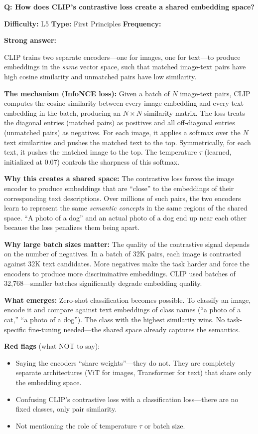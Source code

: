 \begin{interviewq}
\textbf{Q: How does CLIP's contrastive loss create a shared embedding space?}

\textbf{Difficulty:} L5 \quad \textbf{Type:} First Principles \quad \textbf{Frequency:} \freqmed{}

\textbf{Strong answer:}

CLIP trains two separate encoders---one for images, one for text---to produce embeddings in the \textit{same} vector space, such that matched image-text pairs have high cosine similarity and unmatched pairs have low similarity.

\textbf{The mechanism (InfoNCE loss):} Given a batch of $N$ image-text pairs, CLIP computes the cosine similarity between every image embedding and every text embedding in the batch, producing an $N \times N$ similarity matrix. The loss treats the diagonal entries (matched pairs) as positives and all off-diagonal entries (unmatched pairs) as negatives. For each image, it applies a softmax over the $N$ text similarities and pushes the matched text to the top. Symmetrically, for each text, it pushes the matched image to the top. The temperature $\tau$ (learned, initialized at 0.07) controls the sharpness of this softmax.

\textbf{Why this creates a shared space:} The contrastive loss forces the image encoder to produce embeddings that are ``close'' to the embeddings of their corresponding text descriptions. Over millions of such pairs, the two encoders learn to represent the same \textit{semantic concepts} in the same regions of the shared space. ``A photo of a dog'' and an actual photo of a dog end up near each other because the loss penalizes them being apart.

\textbf{Why large batch sizes matter:} The quality of the contrastive signal depends on the number of negatives. In a batch of 32K pairs, each image is contrasted against 32K text candidates. More negatives make the task harder and force the encoders to produce more discriminative embeddings. CLIP used batches of 32,768---smaller batches significantly degrade embedding quality.

\textbf{What emerges:} Zero-shot classification becomes possible. To classify an image, encode it and compare against text embeddings of class names (``a photo of a cat,'' ``a photo of a dog''). The class with the highest similarity wins. No task-specific fine-tuning needed---the shared space already captures the semantics.

\textbf{Red flags} (what NOT to say):
\begin{itemize}
    \item Saying the encoders ``share weights''---they do not. They are completely separate architectures (ViT for images, Transformer for text) that share only the embedding space.
    \item Confusing CLIP's contrastive loss with a classification loss---there are no fixed classes, only pair similarity.
    \item Not mentioning the role of temperature $\tau$ or batch size.
\end{itemize}


\end{interviewq}
